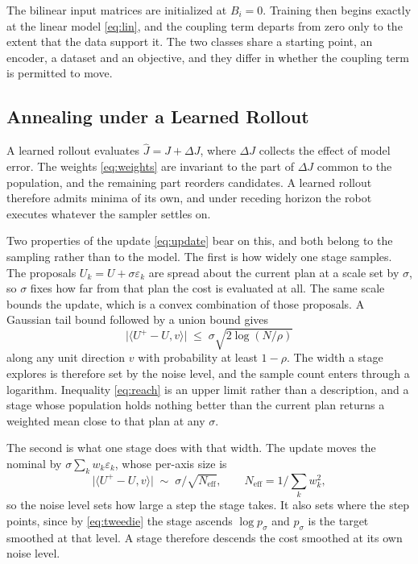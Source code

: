 \documentclass[letterpaper,10pt,conference]{ieeeconf}
\begin{document}
The bilinear input matrices are initialized at $B_i = 0$.
Training then begins exactly at the linear model \eqref{eq:lin}, and the coupling term departs from zero only to the extent that the data support it.
The two classes share a starting point, an encoder, a dataset and an objective, and they differ in whether the coupling term is permitted to move.

\subsection{Annealing under a Learned Rollout}\label{subsec:anneal}

A learned rollout evaluates $\hat{J} = J + \Delta J$, where $\Delta J$ collects the effect of model error.
The weights \eqref{eq:weights} are invariant to the part of $\Delta J$ common to the population, and the remaining part reorders candidates.
A learned rollout therefore admits minima of its own, and under receding horizon the robot executes whatever the sampler settles on.

Two properties of the update \eqref{eq:update} bear on this, and both belong to the sampling rather than to the model.
The first is how widely one stage samples.
The proposals $U_k = U + \sigma \varepsilon_k$ are spread about the current plan at a scale set by $\sigma$, so $\sigma$ fixes how far from that plan the cost is evaluated at all.
The same scale bounds the update, which is a convex combination of those proposals.
A Gaussian tail bound followed by a union bound gives
\begin{equation}
\big|\langle U^{+} - U, v\rangle\big| \;\le\; \sigma \sqrt{2 \log (N/\rho)}
\label{eq:reach}
\end{equation}
along any unit direction $v$ with probability at least $1-\rho$.
The width a stage explores is therefore set by the noise level, and the sample count enters through a logarithm.
Inequality \eqref{eq:reach} is an upper limit rather than a description, and a stage whose population holds nothing better than the current plan returns a weighted mean close to that plan at any $\sigma$.

The second is what one stage does with that width.
The update moves the nominal by $\sigma \sum_k w_k \varepsilon_k$, whose per-axis size is
\begin{equation}
\big|\langle U^{+} - U, v\rangle\big| \;\sim\; \sigma \big/ \sqrt{N_{\mathrm{eff}}},
\qquad N_{\mathrm{eff}} = 1 \big/ \textstyle\sum_k w_k^{2},
\label{eq:step}
\end{equation}
so the noise level sets how large a step the stage takes.
It also sets where the step points, since by \eqref{eq:tweedie} the stage ascends $\log p_{\sigma}$ and $p_\sigma$ is the target smoothed at that level.
A stage therefore descends the cost smoothed at its own noise level.
\end{document}
